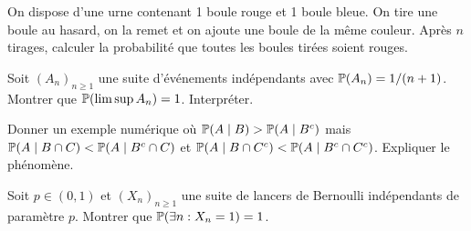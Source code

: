 \begin{exercice}
On dispose d'une urne contenant 1 boule rouge et 1 boule bleue. On tire une boule
au hasard, on la remet et on ajoute une boule de la m\^eme couleur. Apr\`es $n$
tirages, calculer la probabilit\'e que toutes les boules tir\'ees soient rouges.
\end{exercice}

\begin{exercice}
Soit $(A_n)_{n \geq 1}$ une suite d'\'ev\'enements ind\'ependants avec
$\mathbb{P}(A_n) = 1/(n+1)$. Montrer que $\mathbb{P}(\limsup A_n) = 1$. Interpr\'eter.
\end{exercice}

\begin{exercice}
Donner un exemple num\'erique o\`u $\mathbb{P}(A \mid B) > \mathbb{P}(A \mid B^c)$
mais $\mathbb{P}(A \mid B \cap C) < \mathbb{P}(A \mid B^c \cap C)$ et
$\mathbb{P}(A \mid B \cap C^c) < \mathbb{P}(A \mid B^c \cap C^c)$. Expliquer le ph\'enom\`ene.
\end{exercice}

\begin{exercice}
Soit $p \in (0,1)$ et $(X_n)_{n \geq 1}$ une suite de lancers de Bernoulli
ind\'ependants de param\`etre $p$. Montrer que $\mathbb{P}(\exists n : X_n = 1) = 1$.
\end{exercice}
